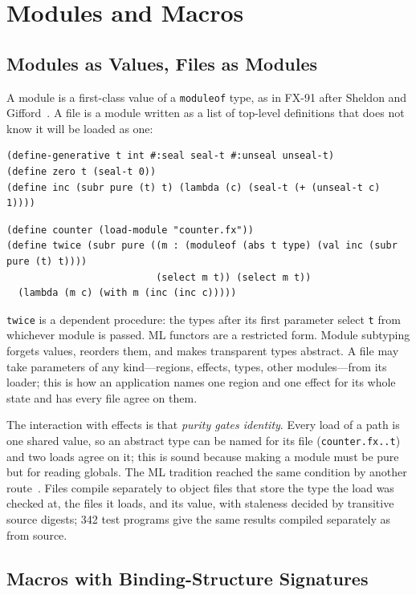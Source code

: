 \documentclass[acmsmall,screen,review]{acmart}
\newcommand{\cd}[1]{\texttt{#1}}
\begin{document}
\section{Modules and Macros}
\label{sec:macros}

\subsection{Modules as Values, Files as Modules}

A module is a first-class value of a \cd{moduleof} type, as in FX-91
after Sheldon and Gifford~\cite{sheldon-gifford}. A file is a module
written as a list of top-level definitions that does not know it will
be loaded as one:
\begin{lstlisting}
(define-generative t int #:seal seal-t #:unseal unseal-t)
(define zero t (seal-t 0))
(define inc (subr pure (t) t) (lambda (c) (seal-t (+ (unseal-t c) 1))))
\end{lstlisting}
\begin{lstlisting}
(define counter (load-module "counter.fx"))
(define twice (subr pure ((m : (moduleof (abs t type) (val inc (subr pure (t) t))))
                          (select m t)) (select m t))
  (lambda (m c) (with m (inc (inc c)))))
\end{lstlisting}
\cd{twice} is a dependent procedure: the types after its first
parameter select \cd{t} from whichever module is passed. ML functors
are a restricted form. Module subtyping forgets values, reorders them,
and makes transparent types abstract. A file may take parameters of any
kind---regions, effects, types, other modules---from its loader; this
is how an application names one region and one effect for its whole
state and has every file agree on them.

The interaction with effects is that \emph{purity gates identity}.
Every load of a path is one shared value, so an abstract type can be
named for its file (\cd{counter.fx..t}) and two loads agree on it;
this is sound because making a module must be pure but for reading
globals. The ML tradition reached the same condition by another
route~\cite{leroy-applicative,f-ing}. Files compile separately to
object files that store the type the load was checked at, the files
it loads, and its value, with staleness decided by transitive source
digests; 342 test programs give the same results compiled separately as from source.

\subsection{Macros with Binding-Structure Signatures}
\end{document}
